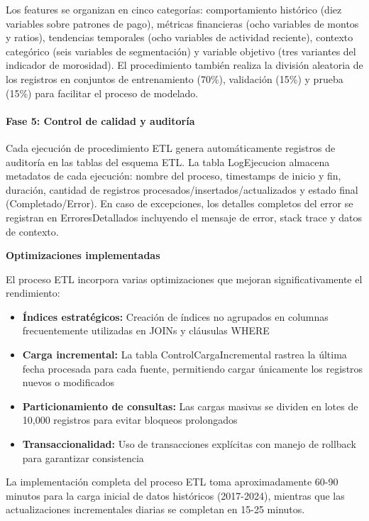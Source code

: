 Los features se organizan en cinco categorías: comportamiento histórico (diez variables sobre patrones de pago), métricas financieras (ocho variables de montos y ratios), tendencias temporales (ocho variables de actividad reciente), contexto categórico (seis variables de segmentación) y variable objetivo (tres variantes del indicador de morosidad). El procedimiento también realiza la división aleatoria de los registros en conjuntos de entrenamiento (70\%), validación (15\%) y prueba (15\%) para facilitar el proceso de modelado.

\paragraph{Fase 5: Control de calidad y auditoría}
Cada ejecución de procedimiento ETL genera automáticamente registros de auditoría en las tablas del esquema ETL. La tabla LogEjecucion almacena metadatos de cada ejecución: nombre del proceso, timestamps de inicio y fin, duración, cantidad de registros procesados/insertados/actualizados y estado final (Completado/Error). En caso de excepciones, los detalles completos del error se registran en ErroresDetallados incluyendo el mensaje de error, stack trace y datos de contexto.

\textbf{Optimizaciones implementadas}

El proceso ETL incorpora varias optimizaciones que mejoran significativamente el rendimiento:

\begin{itemize}
    \item \textbf{Índices estratégicos:} Creación de índices no agrupados en columnas frecuentemente utilizadas en JOINs y cláusulas WHERE
    \item \textbf{Carga incremental:} La tabla ControlCargaIncremental rastrea la última fecha procesada para cada fuente, permitiendo cargar únicamente los registros nuevos o modificados
    \item \textbf{Particionamiento de consultas:} Las cargas masivas se dividen en lotes de 10,000 registros para evitar bloqueos prolongados
    \item \textbf{Transaccionalidad:} Uso de transacciones explícitas con manejo de rollback para garantizar consistencia
\end{itemize}

La implementación completa del proceso ETL toma aproximadamente 60-90 minutos para la carga inicial de datos históricos (2017-2024), mientras que las actualizaciones incrementales diarias se completan en 15-25 minutos.

